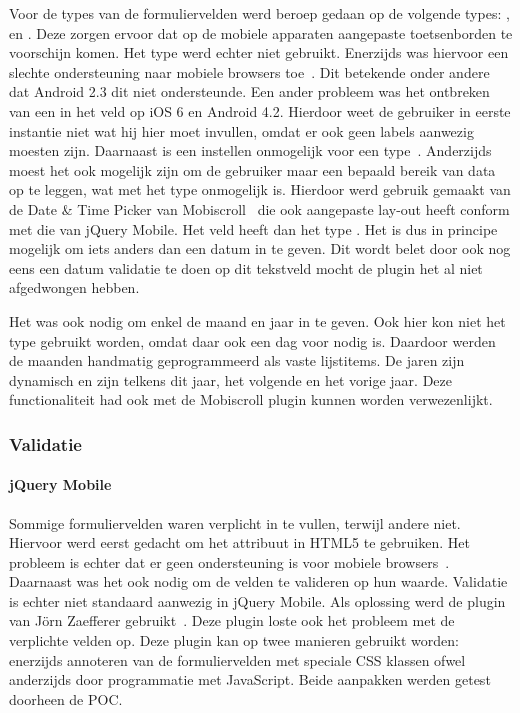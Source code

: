 Voor de types van de formuliervelden werd beroep gedaan op de volgende types: ,  en . 
Deze zorgen ervoor dat op de mobiele apparaten aangepaste toetsenborden te voorschijn komen. 
Het  type werd echter niet gebruikt. 
Enerzijds was hiervoor een slechte ondersteuning naar mobiele browsers toe~\cite{Deveria2013b}. 
Dit betekende onder andere dat Android 2.3 dit niet ondersteunde. 
Een ander probleem was het ontbreken van een  in het veld op iOS 6 en Android 4.2. 
Hierdoor weet de gebruiker in eerste instantie niet wat hij hier moet invullen, omdat er ook geen labels aanwezig moesten zijn. 
Daarnaast is een  instellen onmogelijk voor een  type~\cite{Berjon2012}. 
Anderzijds moest het ook mogelijk zijn om de gebruiker maar een bepaald bereik van data op te leggen, wat met het  type onmogelijk is. 
Hierdoor werd gebruik gemaakt van de Date \& Time Picker van Mobiscroll~\cite{Mobiscroll2013} die ook aangepaste lay-out heeft conform met die van jQuery Mobile. 
Het veld heeft dan het type . 
Het is dus in principe mogelijk om iets anders dan een datum in te geven. 
Dit wordt belet door ook nog eens een datum validatie te doen op dit tekstveld mocht de plugin het al niet afgedwongen hebben.

Het was ook nodig om enkel de maand en jaar in te geven. 
Ook hier kon niet het  type gebruikt worden, omdat daar ook een dag voor nodig is. 
Daardoor werden de maanden handmatig geprogrammeerd als vaste lijstitems. 
De jaren zijn dynamisch en zijn telkens dit jaar, het volgende en het vorige jaar. 
Deze functionaliteit had ook met de Mobiscroll plugin kunnen worden verwezenlijkt.

\subsubsection{Validatie}

\paragraph{jQuery Mobile} 
Sommige formuliervelden waren verplicht in te vullen, terwijl andere niet. 
Hiervoor werd eerst gedacht om het  attribuut in HTML5 te gebruiken. 
Het probleem is echter dat er geen ondersteuning is voor mobiele browsers~\cite{Deveria2013}. 
Daarnaast was het ook nodig om de velden te valideren op hun waarde. 
Validatie is echter niet standaard aanwezig in jQuery Mobile. 
Als oplossing werd de plugin van Jörn Zaefferer gebruikt~\cite{Zaefferer2013}. 
Deze plugin loste ook het probleem met de verplichte velden op. 
Deze plugin kan op twee manieren gebruikt worden: enerzijds annoteren van de formuliervelden met speciale CSS klassen ofwel anderzijds door programmatie met JavaScript. 
Beide aanpakken werden getest doorheen de POC. 

